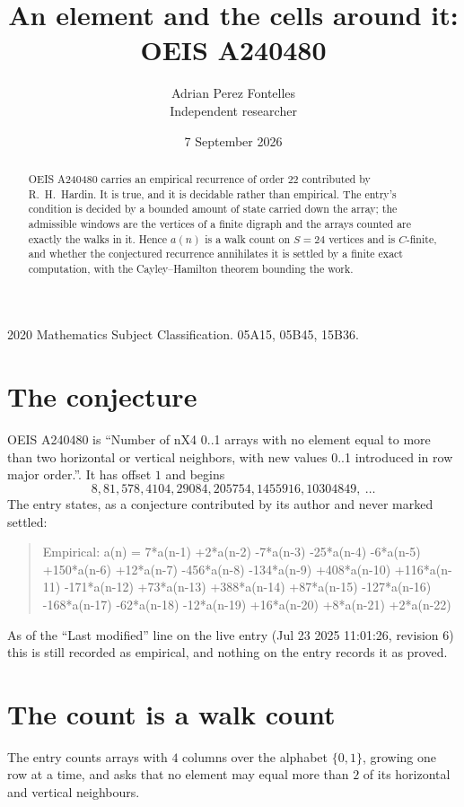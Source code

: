 \documentclass[11pt,a4paper]{article}
\title{An element and the cells around it: OEIS A240480}
\author{Adrian Perez Fontelles\\ \small Independent researcher}
\date{7 September 2026}
\theoremstyle{plain}
\theoremstyle{definition}
\begin{document}
\maketitle

\begin{abstract}
OEIS A240480 carries an empirical recurrence of order $22$ contributed by R.~H.~Hardin. It is
true, and it is decidable rather than empirical. The entry's condition is decided by a bounded amount of state carried down the array; the
admissible windows are the vertices of a finite digraph and the arrays counted are exactly the
walks in it. Hence $a(n)$ is a walk count on $S=24$ vertices and is $C$-finite, and whether the
conjectured recurrence annihilates it is settled by a finite exact computation, with the
Cayley--Hamilton theorem bounding the work.
\end{abstract}

\noindent\small 2020 Mathematics Subject Classification. 05A15, 05B45, 15B36.\normalsize

\section{The conjecture}

OEIS A240480 is ``Number of nX4 0..1 arrays with no element equal to more than two horizontal or vertical neighbors, with new values 0..1 introduced in row major order.''. It has offset $1$ and begins
\[
8, 81, 578, 4104, 29084, 205754, 1455916, 10304849,\ \dots
\]
The entry states, as a conjecture contributed by its author and never marked settled:
\begin{quote}
Empirical: a(n) = 7*a(n-1) +2*a(n-2) -7*a(n-3) -25*a(n-4) -6*a(n-5) +150*a(n-6) +12*a(n-7) -456*a(n-8) -134*a(n-9) +408*a(n-10) +116*a(n-11) -171*a(n-12) +73*a(n-13) +388*a(n-14) +87*a(n-15) -127*a(n-16) -168*a(n-17) -62*a(n-18) -12*a(n-19) +16*a(n-20) +8*a(n-21) +2*a(n-22)
\end{quote}
As of the ``Last modified'' line on the live entry (Jul 23 2025 11:01:26, revision 6) this is still
recorded as empirical, and nothing on the entry records it as proved.

\section{The count is a walk count}

The entry counts arrays with $4$ columns over the alphabet $\{0,1\}$, growing one row at a time, and asks that no element may equal more than $2$ of its horizontal and vertical neighbours.
\end{document}
